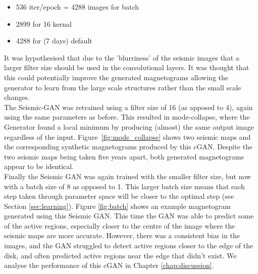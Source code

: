 \documentclass[11pt,a4paper,onecolumn]{report}
\begin{document}
\begin{itemize}
  \item 536 iter/epoch = 4288 images for batch
  \item 2899 for 16 kernal
  \item 4288 for (7 days) default
\end{itemize}

It was hypothesised that due to the 'blurriness' of the seismic images that a
larger filter size should be used in the convolutional layers. It was thought
that this could potentially improve the generated magnetograms allowing the
generator to learn from the large scale structures rather than the small scale
changes.\\

The Seismic-GAN was retrained using a filter size of 16 (as apposed to 4), again
using the same parameters as before. This resulted in mode-collapse, where
the Generator found a local minimum by producing (almost) the same output
image regardless of the input. Figure~\ref{fig:mode_collapse} shows two seismic
maps and the corresponding synthetic magnetograms produced by this cGAN. Despite
the two seismic maps being taken five years apart, both generated magnetograms
appear to be identical.\\

Finally the Seismic GAN was again trained with the smaller filter size, but now
with a batch size of 8 as opposed to 1. This larger batch size means that each
step taken through parameter space will be closer to the optimal step (see
Section \ref{sec:learning}). Figure \ref{fig:batch} shows an example magnetogram
generated using this Seismic GAN. This time the GAN was able to predict some of
the active regions, especially closer to the centre of the image where the
seismic maps are more accurate. However, there was a consistent bias in the
images, and the GAN struggled to detect active regions closer to the edge of the
disk, and often predicted active regions near the edge that didn't exist. We
analyse the performance of this cGAN in Chapter \ref{chap:discussion}.
\end{document}
